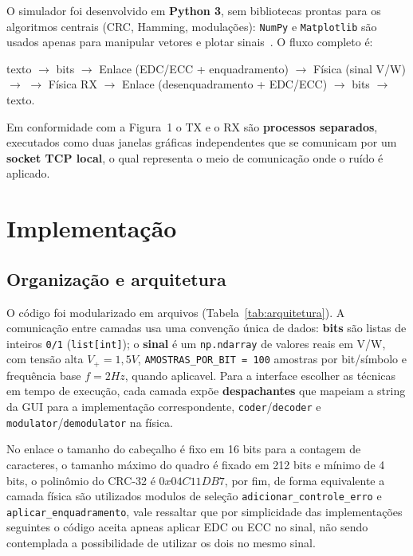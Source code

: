 \documentclass[a4paper, 11pt]{article}
\begin{document}
O simulador foi desenvolvido em \textbf{Python 3}, sem bibliotecas prontas para os algoritmos
centrais (CRC, Hamming, modulações): \texttt{NumPy} e \texttt{Matplotlib} são usados apenas
para manipular vetores e plotar sinais~\cite{numpy,matplotlib}. O fluxo completo é:

\begin{center}
\small
texto $\rightarrow$ bits $\rightarrow$ Enlace (EDC/ECC + enquadramento) $\rightarrow$
Física (sinal V/W) $\rightarrow$  $\rightarrow$
Física RX $\rightarrow$ Enlace (desenquadramento + EDC/ECC) $\rightarrow$ bits $\rightarrow$ texto.
\end{center}

Em conformidade com a Figura~1 o TX e o RX são
\textbf{processos separados}, executados como duas janelas gráficas independentes que se
comunicam por um \textbf{socket TCP local}, o qual representa o meio de comunicação onde o
ruído é aplicado.

\section{Implementação}

\subsection{Organização e arquitetura}

O código foi modularizado em arquivos
(Tabela~\ref{tab:arquitetura}). A comunicação entre camadas usa uma convenção única de dados:
\textbf{bits} são listas de inteiros \texttt{0/1} (\texttt{list[int]}); o \textbf{sinal} é um
\texttt{np.ndarray} de valores reais em V/W, com tensão alta $V_+ = 1,5V$, \texttt{AMOSTRAS\_POR\_BIT = 100} amostras por
bit/símbolo e frequência base $f=2Hz$, quando aplicavel. Para a interface escolher as 
técnicas em tempo de execução, cada camada expõe
\textbf{despachantes} que mapeiam a string da GUI para a implementação correspondente,
\texttt{coder}/\texttt{decoder} e \texttt{modulator}/\texttt{demodulator} na física.

No enlace o tamanho do cabeçalho é fixo em 16 bits para a contagem de caracteres, 
o tamanho máximo do quadro é fixado em 212 bits e mínimo de 4 bits, o polinômio do CRC-32 é $0x04C11DB7$, 
por fim, de forma equivalente a camada física
são utilizados modulos de seleção \texttt{adicionar\_controle\_erro} 
e \texttt{aplicar\_enquadramento}, vale ressaltar que por simplicidade das implementações seguintes
o código aceita apneas aplicar EDC ou ECC no sinal, não sendo contemplada a possibilidade
de utilizar os dois no mesmo sinal. 
\end{document}
